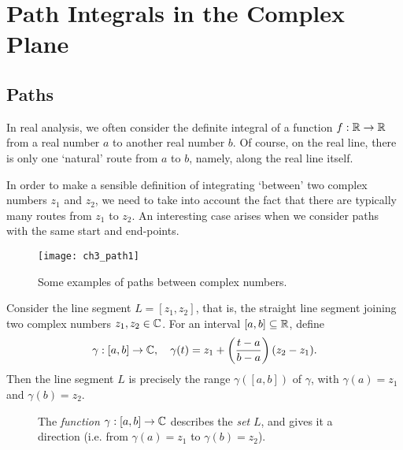 
\chapter{Path Integrals in the Complex Plane}
\section{Paths}

In real analysis, we often consider the definite integral of a function $f: \mathbb{R} \to \mathbb{R}$ from a real number $a$ to another real number $b$.  Of course, on the real line, there is only one `natural' route from $a$ to $b$, namely, along the real line itself.

\begin{comment}
  There are essentially two ways of interpreting `the integral of $f$ between $a$ and $b$;' either integrating
\begin{center}
from $a$ to $b$, that is, $\int_a^b f(t) \ dt$, or \\
from $b$ to $a$, that is, $\int_b^a f(t)\ dt$.
\end{center}
Of course, these integrals have the same absolute value, but with opposite signs.
\end{comment}

In order to make a sensible definition of integrating `between' two complex numbers $z_1$ and $z_2$, we need to take into account the fact that there are typically many routes from $z_1$ to $z_2$.  An interesting case arises when we consider paths with the same start and end-points.

\begin{figure}[H]
\centering
\texttt{[image: ch3\_path1]}
\caption{Some examples of paths between complex numbers.}
\end{figure}

\begin{example}
\label{e:path1}
Consider the line segment $L=[z_1,z_2]$, that is, the straight line segment joining two complex numbers $z_1,z_2 \in \mathbb{C}$.  For an interval $[a,b] \subseteq \mathbb{R}$, define
\[
\gamma : [a,b] \to \mathbb{C}, \quad \gamma (t) = z_1 + \left( \frac{t-a}{b-a} \right) ( z_2 - z_1 ).
\]
Then the line segment $L$ is precisely the range $\gamma \left( [a,b] \right)$ of $\gamma$, with $\gamma (a) = z_1$ and $\gamma (b) = z_2$.

\end{example}

\begin{figure}[H]
\centering
{}
\caption{The \emph{function} $\gamma:[a,b] \to \mathbb{C}$ describes the \emph{set} $L$, and gives it a direction (i.e. from $\gamma(a)=z_1$ to $\gamma (b)=z_2$).}
\end{figure}

